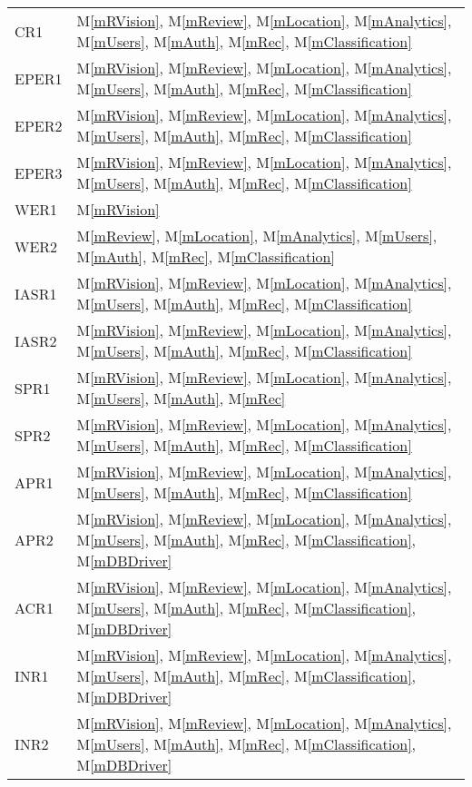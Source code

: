 \documentclass[12pt, titlepage]{article}
\newcommand{\mref}[1]{M\ref{#1}}
\begin{document}
\begin{longtable}{p{} p{}}
CR1 & \mref{mRVision}, \mref{mReview}, \mref{mLocation}, \mref{mAnalytics}, \mref{mUsers}, \mref{mAuth}, \mref{mRec}, \mref{mClassification}\\
EPER1 & \mref{mRVision}, \mref{mReview}, \mref{mLocation}, \mref{mAnalytics}, \mref{mUsers}, \mref{mAuth}, \mref{mRec}, \mref{mClassification}\\
EPER2 & \mref{mRVision}, \mref{mReview}, \mref{mLocation}, \mref{mAnalytics}, \mref{mUsers}, \mref{mAuth}, \mref{mRec}, \mref{mClassification}\\
EPER3 & \mref{mRVision}, \mref{mReview}, \mref{mLocation}, \mref{mAnalytics}, \mref{mUsers}, \mref{mAuth}, \mref{mRec}, \mref{mClassification}\\
WER1 & \mref{mRVision}\\
WER2 & \mref{mReview}, \mref{mLocation}, \mref{mAnalytics}, \mref{mUsers}, \mref{mAuth}, \mref{mRec}, \mref{mClassification}\\
IASR1 & \mref{mRVision}, \mref{mReview}, \mref{mLocation}, \mref{mAnalytics}, \mref{mUsers}, \mref{mAuth}, \mref{mRec}, \mref{mClassification}\\
IASR2 & \mref{mRVision}, \mref{mReview}, \mref{mLocation}, \mref{mAnalytics}, \mref{mUsers}, \mref{mAuth}, \mref{mRec}, \mref{mClassification}\\
SPR1 & \mref{mRVision}, \mref{mReview}, \mref{mLocation}, \mref{mAnalytics}, \mref{mUsers}, \mref{mAuth}, \mref{mRec}\\
SPR2 & \mref{mRVision}, \mref{mReview}, \mref{mLocation}, \mref{mAnalytics}, \mref{mUsers}, \mref{mAuth}, \mref{mRec}, \mref{mClassification}\\
APR1 & \mref{mRVision}, \mref{mReview}, \mref{mLocation}, \mref{mAnalytics}, \mref{mUsers}, \mref{mAuth}, \mref{mRec}, \mref{mClassification}\\
APR2 & \mref{mRVision}, \mref{mReview}, \mref{mLocation}, \mref{mAnalytics}, \mref{mUsers}, \mref{mAuth}, \mref{mRec}, \mref{mClassification}, \mref{mDBDriver}\\
ACR1 & \mref{mRVision}, \mref{mReview}, \mref{mLocation}, \mref{mAnalytics}, \mref{mUsers}, \mref{mAuth}, \mref{mRec}, \mref{mClassification}, \mref{mDBDriver}\\
INR1 & \mref{mRVision}, \mref{mReview}, \mref{mLocation}, \mref{mAnalytics}, \mref{mUsers}, \mref{mAuth}, \mref{mRec}, \mref{mClassification}, \mref{mDBDriver}\\
INR2 & \mref{mRVision}, \mref{mReview}, \mref{mLocation}, \mref{mAnalytics}, \mref{mUsers}, \mref{mAuth}, \mref{mRec}, \mref{mClassification}, \mref{mDBDriver}\\

\end{longtable}
\end{document}
